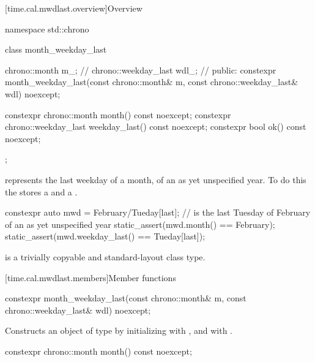 [time.cal.mwdlast.overview]{Overview}

\begin{codeblock}
namespace std::chrono {
  class month_weekday_last {
    chrono::month        m_;    // \expos
    chrono::weekday_last wdl_;  // \expos
  public:
    constexpr month_weekday_last(const chrono::month& m,
                                 const chrono::weekday_last& wdl) noexcept;

    constexpr chrono::month        month()        const noexcept;
    constexpr chrono::weekday_last weekday_last() const noexcept;
    constexpr bool ok() const noexcept;
  };
}
\end{codeblock}

\pnum
{} represents the last weekday of a month,
of an as yet unspecified year.
To do this the  stores a  and a .

\pnum
\begin{example}
\begin{codeblock}
constexpr auto mwd
    = February/Tueday[last];    //  is the last Tuesday of February of an as yet unspecified year
static_assert(mwd.month() == February);
static_assert(mwd.weekday_last() == Tueday[last]);
\end{codeblock}
\end{example}

\pnum
{} is a trivially copyable and standard-layout class type.

[time.cal.mwdlast.members]{Member functions}

%
\begin{itemdecl}
constexpr month_weekday_last(const chrono::month& m,
                             const chrono::weekday_last& wdl) noexcept;
\end{itemdecl}

\begin{itemdescr}
\pnum
\effects
Constructs an object of type  by
initializing  with , and  with .
\end{itemdescr}

%
\begin{itemdecl}
constexpr chrono::month month() const noexcept;
\end{itemdecl}


